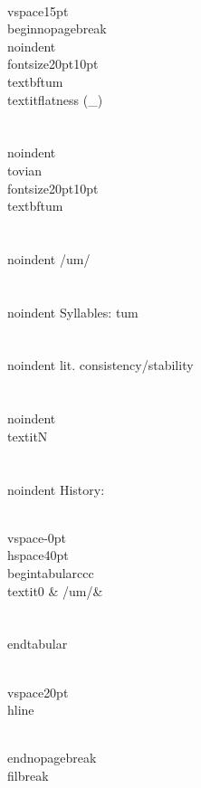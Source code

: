 \\vspace{15pt}
\\begin{nopagebreak}
\\noindent{\\fontsize{20pt}{10pt}\\textbf{tum} } \\textit{flatness} (_)\\\\
\\noindent {\\tovian \\fontsize{20pt}{10pt} \\textbf{tum} }\\\\
\\noindent /{}{\textprimstress}um/\\\\
\\noindent Syllables: tum\\\\
\\noindent lit. consistency/stability\\\\
\\noindent \\textit{N}\\\\


\\noindent History:

\\vspace{-0pt}
\\hspace{40pt}
\\begin{tabular}{ccc}
\\textit{0} & /{}um/& \\\\
\\end{tabular}

\\vspace{20pt}\\hline

\\end{nopagebreak}
\\filbreak



